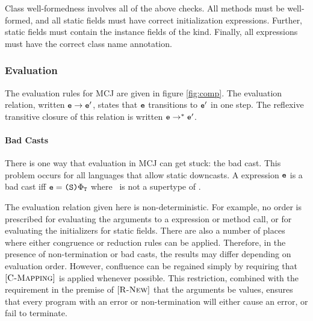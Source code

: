 \documentclass[nocopyrightspace,10pt]{acm-sigplan}
\begin{document}
Class well-formedness involves all of the above checks.
All methods must be well-formed, and all static fields must
have correct initialization expressions.  Further, static fields
must contain the instance fields of the kind.  Finally, all
{} expressions must have the correct class name annotation.


\figExprty

\figWF

\subsubsection{Evaluation}

The evaluation rules for MCJ are given in figure \ref{fig:comp}.
The evaluation relation, written ${\mbox {\tt e}} \rightarrow \mbox {\tt e$'$}$, states that $\mbox {\tt e}$
transitions to $\mbox {\tt e$'$}$ in one step.  The reflexive transitive closure of
this relation is written $\mbox {\tt e} \rightarrow^* \mbox {\tt e$'$}$.

%


\paragraph{Bad Casts}
There is one way that evaluation in MCJ can get stuck: the bad cast.
This problem occurs for all languages that allow static downcasts.  A
expression $\mbox {\tt e}$ is a bad cast iff $\mbox {\tt e} = \mbox{\tt \mbox{\tt (}\mbox {\tt S}\mbox{\tt )}{\ensuremath {\Phi_{\mathtt{{T}}}}}}$ where
\SSS\ is not a supertype of \T.

The evaluation relation given here is non-deterministic. For example,
no order is prescribed for evaluating the arguments to a {}
expression or method call, or for evaluating the initializers for
static fields.  There are also a number of places where either
congruence or reduction rules can be applied.  Therefore, in the
presence of non-termination or bad casts, the results may differ
depending on evaluation order.  However, confluence can be regained
simply by requiring that $[{\textsc {C-Mapping}}]$ is applied whenever
possible.  This restriction, combined with the requirement in the
premise of $[{\textsc {R-New}}]$ that the arguments be values, ensures
that every program with an error or non-termination will either cause
an error, or fail to terminate.  
\end{document}
